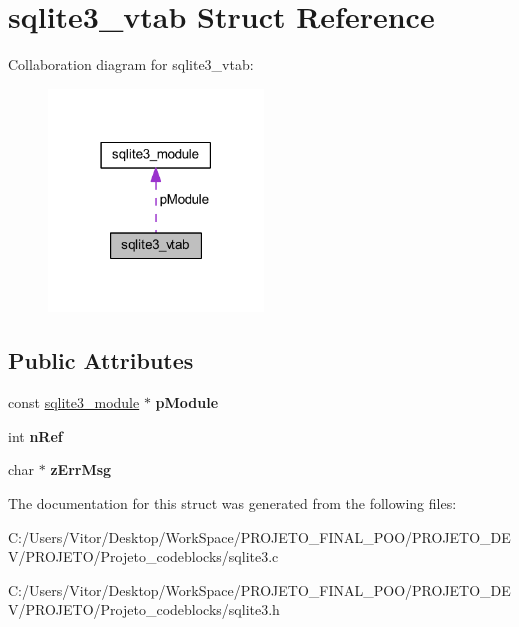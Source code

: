 \hypertarget{structsqlite3__vtab}{\section{sqlite3\-\_\-vtab Struct Reference}
\label{structsqlite3__vtab}
}


Collaboration diagram for sqlite3\-\_\-vtab\-:\nopagebreak
\begin{figure}[H]
\begin{center}
\leavevmode
\includegraphics[width=162pt]{structsqlite3__vtab__coll__graph}
\end{center}
\end{figure}
\subsection*{Public Attributes}
\begin{DoxyCompactItemize}
\item 
\hypertarget{structsqlite3__vtab_acf0d906e36b113669eaa883c5f8b5ba0}{const \hyperlink{structsqlite3__module}{sqlite3\-\_\-module} $\ast$ {\bfseries p\-Module}}\label{structsqlite3__vtab_acf0d906e36b113669eaa883c5f8b5ba0}

\item 
\hypertarget{structsqlite3__vtab_ab3c80d385849bdd82363a0df7d6fcba8}{int {\bfseries n\-Ref}}\label{structsqlite3__vtab_ab3c80d385849bdd82363a0df7d6fcba8}

\item 
\hypertarget{structsqlite3__vtab_a47331586775d674ae951b07ebb902fca}{char $\ast$ {\bfseries z\-Err\-Msg}}\label{structsqlite3__vtab_a47331586775d674ae951b07ebb902fca}

\end{DoxyCompactItemize}


The documentation for this struct was generated from the following files\-:\begin{DoxyCompactItemize}
\item 
C\-:/\-Users/\-Vitor/\-Desktop/\-Work\-Space/\-P\-R\-O\-J\-E\-T\-O\-\_\-\-F\-I\-N\-A\-L\-\_\-\-P\-O\-O/\-P\-R\-O\-J\-E\-T\-O\-\_\-\-D\-E\-V/\-P\-R\-O\-J\-E\-T\-O/\-Projeto\-\_\-codeblocks/sqlite3.\-c\item 
C\-:/\-Users/\-Vitor/\-Desktop/\-Work\-Space/\-P\-R\-O\-J\-E\-T\-O\-\_\-\-F\-I\-N\-A\-L\-\_\-\-P\-O\-O/\-P\-R\-O\-J\-E\-T\-O\-\_\-\-D\-E\-V/\-P\-R\-O\-J\-E\-T\-O/\-Projeto\-\_\-codeblocks/sqlite3.\-h\end{DoxyCompactItemize}
